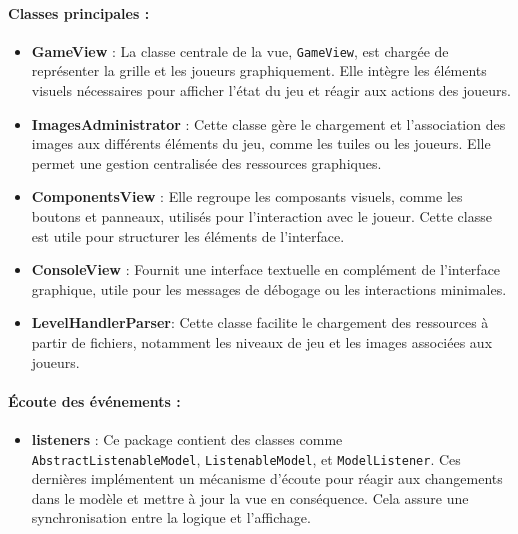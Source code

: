 \documentclass[12pt]{article}
\begin{document}
\paragraph{Classes principales :}
\begin{itemize}
    \item \textbf{GameView} :  
    La classe centrale de la vue, \texttt{GameView}, est chargée de représenter la grille et les joueurs graphiquement. Elle intègre les éléments visuels nécessaires pour afficher l'état du jeu et réagir aux actions des joueurs.

    \item \textbf{ImagesAdministrator} :  
    Cette classe gère le chargement et l'association des images aux différents éléments du jeu, comme les tuiles ou les joueurs. Elle permet une gestion centralisée des ressources graphiques.

    \item \textbf{ComponentsView} :  
    Elle regroupe les composants visuels, comme les boutons et panneaux, utilisés pour l'interaction avec le joueur. Cette classe est utile pour structurer les éléments de l'interface.

    \item \textbf{ConsoleView} :  
    Fournit une interface textuelle en complément de l'interface graphique, utile pour les messages de débogage ou les interactions minimales.

    \item \textbf{LevelHandlerParser}:  
    Cette classe facilite le chargement des ressources à partir de fichiers, notamment les niveaux de jeu et les images associées aux joueurs.
\end{itemize}

\paragraph{Écoute des événements :}
\begin{itemize}
    \item \textbf{listeners} :  
    Ce package contient des classes comme \texttt{AbstractListenableModel}, \texttt{ListenableModel}, et \texttt{ModelListener}. Ces dernières implémentent un mécanisme d'écoute pour réagir aux changements dans le modèle et mettre à jour la vue en conséquence. Cela assure une synchronisation entre la logique et l'affichage.
\end{itemize}
\end{document}
